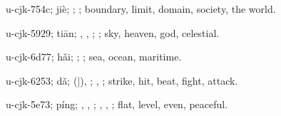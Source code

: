 \begin{multicols}{2}
{\cjkgGlue{}u-cjk-754c; jiè; \cjkgGlue{}; \cjkgGlue{}; boundary, limit, domain, society, the world.

\cjkgGlue{}u-cjk-5929; tiān; \cjkgGlue{}, \cjkgGlue{}, \cjkgGlue{}; \cjkgGlue{}; sky, heaven, god, celestial.

\cjkgGlue{}u-cjk-6d77; hǎi; \cjkgGlue{}; \cjkgGlue{}; sea, ocean, maritime.

\cjkgGlue{}u-cjk-6253; dǎ; \cjkgGlue{}\cjkgGlue{}(\cjkgGlue{}|\cjkgGlue{}), \cjkgGlue{}\cjkgGlue{}\cjkgGlue{}; \cjkgGlue{}, \cjkgGlue{}; strike, hit, beat, fight, attack.

\cjkgGlue{}u-cjk-5e73; píng; \cjkgGlue{}\cjkgGlue{}\cjkgGlue{}, \cjkgGlue{}, \cjkgGlue{}; \cjkgGlue{}, \cjkgGlue{}, \cjkgGlue{}; flat, level, even, peaceful.

}
\end{multicols}
